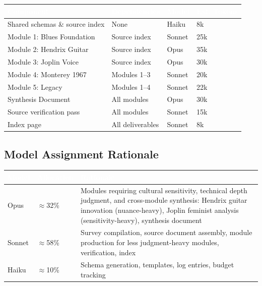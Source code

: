 \documentclass[11pt,letterpaper]{article}
\newcommand{\tableheader}[1]{\textbf{\sffamily\textcolor{white}{#1}}}
\begin{document}
\begin{center}
\begin{tabularx}{\textwidth}{L{3.5cm}L{2.5cm}C{2cm}C{2cm}}
\toprule
{}
\tableheader{Component} & \tableheader{Dependencies} & \tableheader{Model} & \tableheader{Est. Tokens} \\
\midrule
Shared schemas \& source index & None & Haiku & 8k \\
Module 1: Blues Foundation & Source index & Sonnet & 25k \\
Module 2: Hendrix Guitar & Source index & Opus & 35k \\
Module 3: Joplin Voice & Source index & Opus & 30k \\
Module 4: Monterey 1967 & Modules 1--3 & Sonnet & 20k \\
Module 5: Legacy & Modules 1--4 & Sonnet & 22k \\
Synthesis Document & All modules & Opus & 30k \\
Source verification pass & All modules & Sonnet & 15k \\
Index page & All deliverables & Sonnet & 8k \\
\bottomrule
\end{tabularx}
\end{center}

\subsection{Model Assignment Rationale}

\begin{center}
\begin{tabularx}{\textwidth}{L{2cm}C{2cm}X}
\toprule
{}
\tableheader{Model} & \tableheader{Allocation} & \tableheader{Rationale} \\
\midrule
Opus & $\approx$32\% & Modules requiring cultural sensitivity, technical depth judgment, and cross-module synthesis: Hendrix guitar innovation (nuance-heavy), Joplin feminist analysis (sensitivity-heavy), synthesis document \\
Sonnet & $\approx$58\% & Survey compilation, source document assembly, module production for less judgment-heavy modules, verification, index \\
Haiku & $\approx$10\% & Schema generation, templates, log entries, budget tracking \\
\bottomrule
\end{tabularx}
\end{center}
\end{document}
